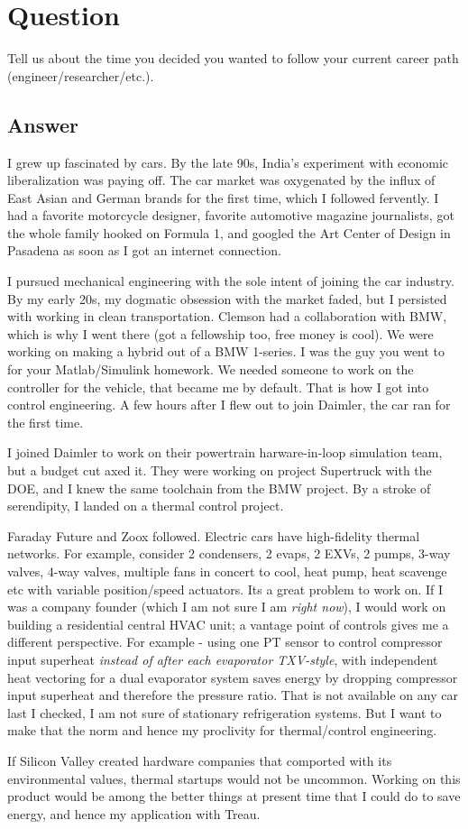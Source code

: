 \section{Question}
Tell us about the time you decided you wanted to follow your current career path
(engineer/researcher/etc.).

\subsection *{Answer}
I grew up fascinated by cars. By the late 90s, India's experiment with economic liberalization was paying off. The car market was oxygenated by the influx of East Asian and German brands for the first time, which I followed fervently. I had a favorite motorcycle designer, favorite automotive magazine journalists, got the whole family hooked on Formula 1, and googled the Art Center of Design in Pasadena as soon as I got an internet connection.

I pursued mechanical engineering with the sole intent of joining the car industry. By my early 20s, my dogmatic obsession with the market faded, but I persisted with working in clean transportation. Clemson had a collaboration with BMW, which is why I went there (got a fellowship too, free money is cool). We were working on making a hybrid out of a BMW 1-series. I was the guy you went to for your Matlab/Simulink homework. We needed someone to work on the controller for the vehicle, that became me by default. That is how I got into control engineering. A few hours after I flew out to join Daimler, the car ran for the first time.

I joined Daimler to work on their powertrain harware-in-loop simulation team, but a budget cut axed it. They were working on project Supertruck with the DOE, and I knew the same toolchain from the BMW project. By a stroke of serendipity, I landed on a thermal control project.

Faraday Future and Zoox followed. Electric cars have high-fidelity thermal networks. For example, consider 2 condensers, 2 evaps, 2 EXVs, 2 pumps, 3-way valves, 4-way valves, multiple fans in concert to cool, heat pump, heat scavenge etc with variable position/speed actuators. Its a great problem to work on. If I was a company founder (which I am not sure I am \textit{right now}), I would work on building a residential central HVAC unit; a vantage point of controls gives me a different perspective. For example - using one PT sensor to control compressor input superheat \textit{instead of after each evaporator TXV-style}, with independent heat vectoring for a dual evaporator system saves energy by dropping compressor input superheat and therefore the pressure ratio. That is not available on any car last I checked, I am not sure of stationary refrigeration systems. But I want to make that the norm and hence my proclivity for thermal/control engineering.

If Silicon Valley created hardware companies that comported with its environmental values, thermal startups would not be uncommon. Working on this product would be among the better things at present time that I could do to save energy, and hence my application with Treau.
